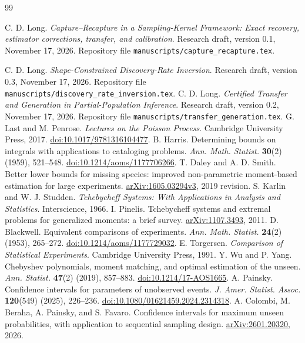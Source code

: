 \documentclass[11pt]{article}
\theoremstyle{remark}\newtheorem{remark}[theorem]{Remark}
\begin{document}
\begin{thebibliography}{99}\raggedright
{}
C. D. Long. \emph{Capture--Recapture in a Sampling-Kernel Framework:
Exact recovery, estimator corrections, transfer, and calibration}.
Research draft, version 0.1, November 17, 2026.
Repository file \texttt{manuscripts/capture\_recapture.tex}.

 C. D. Long.
\emph{Shape-Constrained Discovery-Rate Inversion}.
Research draft, version 0.3, November 17, 2026.
Repository file \texttt{manuscripts/discovery\_rate\_inversion.tex}.
 C. D. Long.
\emph{Certified Transfer and Generation in Partial-Population Inference}.
Research draft, version 0.2, November 17, 2026.
Repository file \texttt{manuscripts/transfer\_generation.tex}.
 G. Last and M. Penrose.
\emph{Lectures on the Poisson Process}. Cambridge University Press, 2017.
\href{https://doi.org/10.1017/9781316104477}{doi:10.1017/9781316104477}.
 B. Harris.
Determining bounds on integrals with applications to cataloging problems.
\emph{Ann. Math. Statist.} \textbf{30}(2) (1959), 521--548.
\href{https://doi.org/10.1214/aoms/1177706266}{doi:10.1214/aoms/1177706266}.
 T. Daley and A. D. Smith.
Better lower bounds for missing species: improved non-parametric moment-based
estimation for large experiments.
\href{https://arxiv.org/abs/1605.03294v3}{arXiv:1605.03294v3}, 2019 revision.
 S. Karlin and W. J. Studden.
\emph{Tchebycheff Systems: With Applications in Analysis and Statistics}.
Interscience, 1966.
 I. Pinelis.
Tchebycheff systems and extremal problems for generalized moments: a brief survey.
\href{https://arxiv.org/abs/1107.3493}{arXiv:1107.3493}, 2011.
 D. Blackwell.
Equivalent comparisons of experiments.
\emph{Ann. Math. Statist.} \textbf{24}(2) (1953), 265--272.
\href{https://doi.org/10.1214/aoms/1177729032}{doi:10.1214/aoms/1177729032}.
 E. Torgersen.
\emph{Comparison of Statistical Experiments}. Cambridge University Press, 1991.
 Y. Wu and P. Yang.
Chebyshev polynomials, moment matching, and optimal estimation of the unseen.
\emph{Ann. Statist.} \textbf{47}(2) (2019), 857--883.
\href{https://doi.org/10.1214/17-AOS1665}{doi:10.1214/17-AOS1665}.
 A. Painsky.
Confidence intervals for parameters of unobserved events.
\emph{J. Amer. Statist. Assoc.} \textbf{120}(549) (2025), 226--236.
\href{https://doi.org/10.1080/01621459.2024.2314318}{doi:10.1080/01621459.2024.2314318}.
 A. Colombi, M. Beraha, A. Painsky, and S. Favaro.
Confidence intervals for maximum unseen probabilities, with application to
sequential sampling design.
\href{https://arxiv.org/abs/2601.20320}{arXiv:2601.20320}, 2026.
\end{thebibliography}
\end{document}
